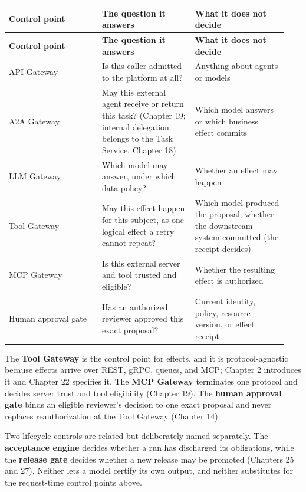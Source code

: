\BookTableStart
\small
\begin{longtable}{@{}Y{0.3133\linewidth}Y{0.3133\linewidth}Y{0.3133\linewidth}@{}}
\color{white}\bfseries Control point & \color{white}\bfseries The question it answers & \color{white}\bfseries What it does not decide \\
\endfirsthead
{}
\color{white}\bfseries Control point & \color{white}\bfseries The question it answers & \color{white}\bfseries What it does not decide \\
\endhead
API Gateway & Is this caller admitted to the platform at all? & Anything about agents or models \\
A2A Gateway & May this external agent receive or return this task? (Chapter 19; internal delegation belongs to the Task Service, Chapter 18) & Which model answers or which business effect commits \\
LLM Gateway & Which model may answer, under which data policy? & Whether an effect may happen \\
Tool Gateway & May this effect happen for this subject, as one logical effect a retry cannot repeat? & Which model produced the proposal; whether the downstream system committed (the receipt decides) \\
MCP Gateway & Is this external server and tool trusted and eligible? & Whether the resulting effect is authorized \\
Human approval gate & Has an authorized reviewer approved this exact proposal? & Current identity, policy, resource version, or effect receipt \\
\end{longtable}
\BookTableEnd

The \textbf{Tool Gateway} is the control point for effects, and it is protocol-agnostic because effects arrive over REST, gRPC, queues, and MCP; Chapter 2 introduces it and Chapter 22 specifies it. The \textbf{MCP Gateway} terminates one protocol and decides server trust and tool eligibility (Chapter 19). The \textbf{human approval gate} binds an eligible reviewer's decision to one exact proposal and never replaces reauthorization at the Tool Gateway (Chapter 14).\par

Two lifecycle controls are related but deliberately named separately. The \textbf{acceptance engine} decides whether a run has discharged its obligations, while the \textbf{release gate} decides whether a new release may be promoted (Chapters 25 and 27). Neither lets a model certify its own output, and neither substitutes for the request-time control points above.\par

